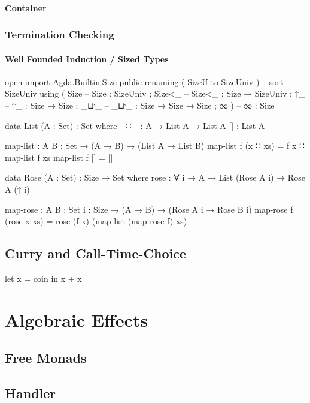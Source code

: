 \documentclass[10pt,a4paper,twoside]{report}
\begin{document}
\subsubsection{Container}

\subsection{Termination Checking}

\subsubsection{Well Founded Induction / Sized Types}

\begin{code}
open import Agda.Builtin.Size public
  renaming ( SizeU to SizeUniv )  --  sort SizeUniv
  using    ( Size                 --  Size   : SizeUniv
           ; Size<_               --  Size<_ : Size → SizeUniv
           ; ↑_                   --  ↑_     : Size → Size
           ; _⊔ˢ_                 --  _⊔ˢ_   : Size → Size → Size
           ; ∞ )                  --  ∞      : Size

data List (A : Set) : Set where
  _∷_  : A → List A → List A
  []   : List A

map-list : {A B : Set} → (A → B) → (List A → List B)
map-list f (x ∷ xs)  = f x ∷ map-list f xs
map-list f []        = []

data Rose (A : Set) : Size → Set where
  rose : ∀ {i} → A → List (Rose A i) → Rose A (↑ i)

map-rose : {A B : Set} {i : Size} → (A → B) → (Rose A i → Rose B i)
map-rose f (rose x xs) = rose (f x) (map-list (map-rose f) xs)
\end{code}

\section{Curry and Call-Time-Choice}
let x = coin in x + x

\chapter{Algebraic Effects}
\section{Free Monads}

\section{Handler}
\end{document}
